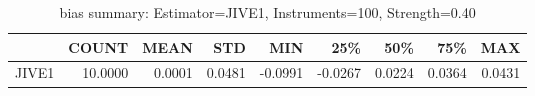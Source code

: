 \begin{table}[ht]
\centering
\caption{bias summary: Estimator=JIVE1, Instruments=100, Strength=0.40}
\begin{tabular}{lrrrrrrrr}
\toprule
 & COUNT & MEAN & STD & MIN & 25\% & 50\% & 75\% & MAX \\
\midrule
JIVE1 & 10.0000 & 0.0001 & 0.0481 & -0.0991 & -0.0267 & 0.0224 & 0.0364 & 0.0431 \\
\bottomrule
\end{tabular}
\end{table}
